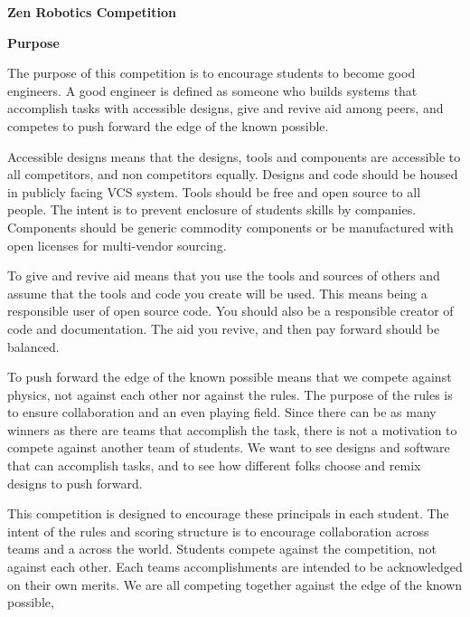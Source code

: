 \documentclass{article}
\begin{document}
	
{\huge \textbf{Zen Robotics Competition}}

\vspace{1cm}

{\huge \textbf{Purpose}}
\vspace{1cm}

The purpose of this competition is to encourage students to become good engineers. A good engineer is defined as someone who builds systems that accomplish tasks with accessible designs, give and revive aid among peers, and competes to push forward the edge of the known possible. 

Accessible designs means that the designs, tools and components are accessible to all competitors, and non competitors equally. Designs and code should be housed in publicly facing VCS system. Tools should be free and open source to all people. The intent is to prevent enclosure of students skills by companies.  Components should be generic commodity components or be manufactured with open licenses for multi-vendor sourcing.  

To give and revive aid means that you use the tools and sources of others and assume that the tools and code you create will be used. This means being a responsible user of open source code. You should also be a responsible creator of code and documentation. The aid you revive, and then pay forward should be  balanced. 

To push forward the edge of the known possible means that we compete against physics, not against each other nor against the rules. The purpose of the rules is to ensure collaboration and an even playing field. Since there can be as many winners as there are teams that accomplish the task, there is not a motivation to compete against another team of students. We want to see designs and software that can accomplish tasks, and to see how different folks choose and remix designs to push forward. 

  
This competition is designed to encourage these principals in each student. The intent of the rules and scoring structure is to encourage collaboration across teams and a across the world. Students compete against the competition, not against each other. Each teams accomplishments are intended to be acknowledged on their own merits. We are all competing together against the edge of the known possible, 
\end{document}
